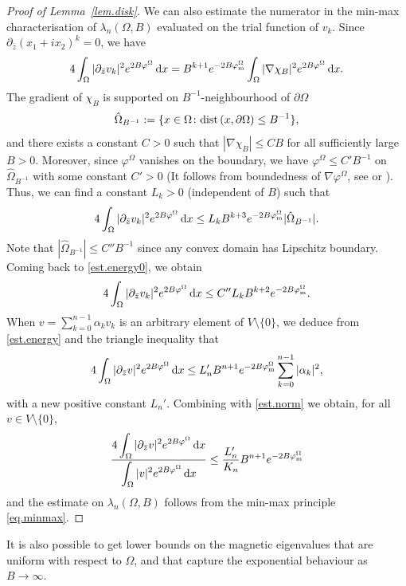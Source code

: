 \documentclass[11pt,a4paper]{amsart}
\newcommand\nb{\nabla}
\newcommand\Omg{\Omega}
\def\p{\partial}
\def\lm{\lambda}
\def\p{\partial}
\def\dd{{\,\mathrm{d}}}
\numberwithin{figure}{section}
\numberwithin{equation}{section}
\theoremstyle{plain}%
\theoremstyle{remark}
\theoremstyle{plain}
\begin{document}
\begin{proof}[Proof of Lemma~\ref{lem.disk}]
We can also estimate the numerator in the min-max characterisation of $\lm_{n}(\Omg,B)$ evaluated on the trial function of $v_k$. Since $\partial_{\bar z} (x_1+ix_2)^k=0$, we have
\begin{align*}
4 \int_\Omg  | \partial_{\bar z} v_k |^2 e^{2B \varphi^\Omg} \dd x =B^{k+1}e^{-2 B  \varphi_{\rm m}^\Omg}\int_\Omg  | \nabla \chi_B |^2 e^{2B \varphi^\Omg} \dd x .
\end{align*}
The gradient of $\chi_B$ is supported on $B^{-1}$-neighbourhood of $\p\Omg$ \[
\hat\Omg_{B^{-1}}:=\{x\in\Omg\colon{\rm dist}\,(x,\p\Omg)\le B^{-1}\},\] 
and there exists a constant $C >0$  such that $|\nb \chi_B| \le CB$ for all sufficiently large $B >0$. Moreover, since $\varphi^\Omega$ vanishes on the boundary, we have $\varphi^\Omg \leq C' B^{-1}$ on $\hat\Omg_{B^{-1}}$ with some constant $C' > 0$ (It follows from boundedness of $\nabla \varphi^\Omg$, see \cite[Eq. 6.12]{S81} or \cite{HS}). Thus, we can find a constant $L_k >0$ (independent of $B$) such that
\begin{equation}\label{est.energy0}
4 \int_\Omg  | \partial_{\bar z} v_k |^2 e^{2B \varphi^\Omg} \dd x \leq L_k B^{k+3} e^{-2B \varphi_{\rm m}^\Omg} | \hat\Omega_{B^{-1}}|.
\end{equation}
Note that $|\hat \Omega_{B^{-1}}| \leq C'' B^{-1}$ since
any convex domain has Lipschitz boundary.  Coming back to \eqref{est.energy0}, we obtain
\begin{equation}\label{est.energy}
4 \int_\Omg  | \partial_{\bar z} v_k |^2 e^{2B \varphi^\Omg} \dd x \leq C'' L_k B^{k+2} e^{-2B \varphi_{{\rm m}}^\Omega}.
\end{equation}
When $v = \sum_{k=0}^{n-1} \alpha_k v_k$ is an arbitrary element of $V\setminus\{0\}$, we deduce from \eqref{est.energy} and the triangle inequality that
\[4 \int_\Omg  | \partial_{\bar z} v |^2 e^{2B \varphi^\Omg} \dd x \leq L_n' B^{n+1} e^{-2B \varphi_{\rm m}^\Omega} \sum_{k=0}^{n-1} |\alpha_k|^2,\]
with a new positive constant $L_n'$. Combining with \eqref{est.norm} we obtain, for all $v \in V\setminus\{0\}$,
\[ \frac{\displaystyle 4 \int_\Omg | \partial_{\bar z} v |^2 e^{2B \varphi^\Omg} \dd x }{\displaystyle\int_\Omg |v|^2 e^{2B \varphi^\Omg} \dd x} \leq \frac{L_n'}{K_n} B^{n+1} e^{-2B \varphi_{\rm m}^\Omega}  \]
and the estimate on $\lambda_n(\Omega,B)$ follows from the min-max principle \eqref{eq.minmax}.
\end{proof}

It is also possible to get lower bounds on the magnetic eigenvalues that are uniform with respect to $\Omega$, and that capture the exponential behaviour as $B \to \infty$. 
\end{document}
